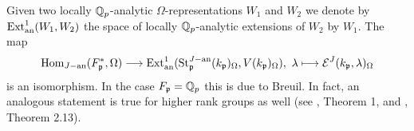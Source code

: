 \begin{Rem}
Given two locally $\mathbb{Q}_p$-analytic $\Omega$-representations $W_1$ and $W_2$ we denote by $\operatorname{Ext}^{1}_{\operatorname{an}}(W_1,W_2)$ the space of locally $\mathbb{Q}_p$-analytic extensions of $W_2$ by $W_1$. The map
$$\operatorname{Hom}_{J-\operatorname{an}}(F_{\mathfrak{p}}^{\ast},\Omega)\longrightarrow \operatorname{Ext}^{1}_{\operatorname{an}}(\operatorname{St}_{\mathfrak{p}}^{J-\operatorname{an}}(k_{\mathfrak{p}})_\Omega,V(k_{\mathfrak{p}})_\Omega),\ \lambda \longmapsto \mathcal{E}^{J}(k_{\mathfrak{p}} ,\lambda)_\Omega$$
is an isomorphism.
In the case $F_{\mathfrak{p}}=\mathbb{Q}_p$ this is due to Breuil.
In fact, an analogous statement is true for higher rank groups as well (see \cite{Ding}, Theorem 1, and \cite{Ge4}, Theorem 2.13).
\end{Rem}




